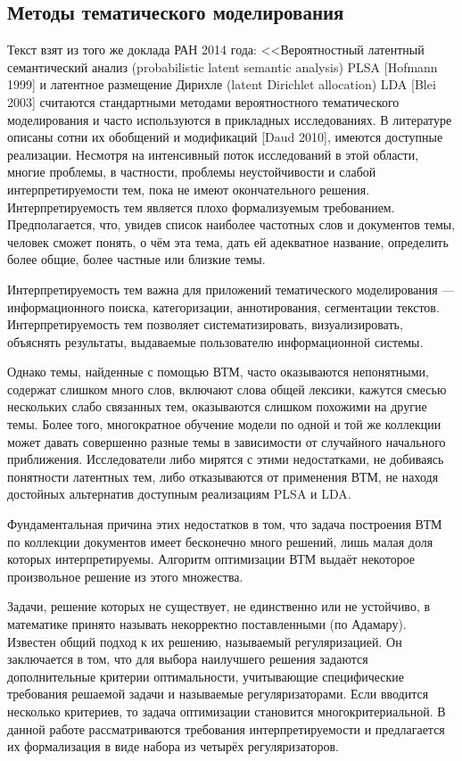 \documentclass[a4paper,14pt]{extarticle}
\begin{document}
\subsection{Методы тематического моделирования}
Текст взят из того же доклада РАН 2014 года: <<Вероятностный латентный семантический анализ (probabilistic latent semantic
analysis) PLSA [Hofmann 1999] и латентное размещение Дирихле (latent Dirichlet
allocation) LDA [Blei 2003] считаются стандартными методами вероятностного
тематического моделирования и часто используются в прикладных исследованиях.
В литературе описаны сотни их обобщений и модификаций [Daud 2010], имеются
доступные реализации. Несмотря на интенсивный поток исследований в этой
области, многие проблемы, в частности, проблемы неустойчивости и слабой
интерпретируемости тем, пока не имеют окончательного решения.
Интерпретируемость тем является плохо формализуемым требованием.
Предполагается, что, увидев список наиболее частотных слов и документов темы,
человек сможет понять, о чём эта тема, дать ей адекватное название, определить
более общие, более частные или близкие темы.

Интерпретируемость тем важна для
приложений тематического моделирования — информационного поиска,
категоризации, аннотирования, сегментации текстов. Интерпретируемость тем
позволяет систематизировать, визуализировать, объяснять результаты,
выдаваемые пользователю информационной системы.


Однако темы, найденные с помощью ВТМ, часто оказываются непонятными,
содержат слишком много слов, включают слова общей лексики, кажутся смесью
нескольких слабо связанных тем, оказываются слишком похожими на другие темы.
Более того, многократное обучение модели по одной и той же коллекции может
давать совершенно разные темы в зависимости от случайного начального
приближения. Исследователи либо мирятся с этими недостатками, не добиваясь
понятности латентных тем, либо отказываются от применения ВТМ, не находя
достойных альтернатив доступным реализациям PLSA и LDA.


Фундаментальная причина этих недостатков в том, что задача построения ВТМ
по коллекции документов имеет бесконечно много решений, лишь малая доля
которых интерпретируемы. Алгоритм оптимизации ВТМ выдаёт некоторое
произвольное решение из этого множества.

Задачи, решение которых не существует, не единственно или не устойчиво, в
математике принято называть некорректно поставленными (по Адамару). Известен
общий подход к их решению, называемый регуляризацией. Он заключается в том,
что для выбора наилучшего решения задаются дополнительные критерии
оптимальности, учитывающие специфические требования решаемой задачи и
называемые регуляризаторами. Если вводится несколько критериев, то задача
оптимизации становится многокритериальной. В данной работе рассматриваются
требования интерпретируемости и предлагается их формализация в виде набора из
четырёх регуляризаторов.
\end{document}
